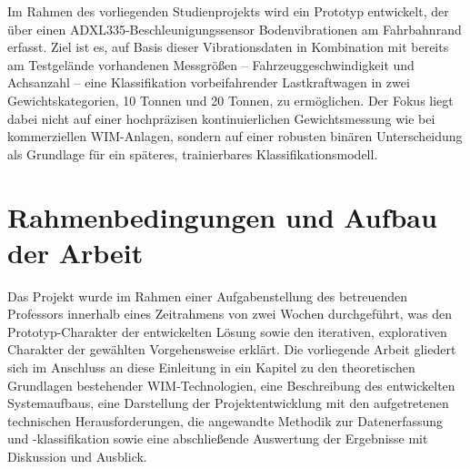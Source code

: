 Im Rahmen des vorliegenden Studienprojekts wird ein Prototyp entwickelt, der über einen ADXL335-Beschleunigungssensor Bodenvibrationen am Fahrbahnrand erfasst. Ziel ist es, auf Basis dieser Vibrationsdaten in Kombination mit bereits am Testgelände vorhandenen Messgrößen -- Fahrzeuggeschwindigkeit und Achsanzahl -- eine Klassifikation vorbeifahrender Lastkraftwagen in zwei Gewichtskategorien, 10 Tonnen und 20 Tonnen, zu ermöglichen. Der Fokus liegt dabei nicht auf einer hochpräzisen kontinuierlichen Gewichtsmessung wie bei kommerziellen WIM-Anlagen, sondern auf einer robusten binären Unterscheidung als Grundlage für ein späteres, trainierbares Klassifikationsmodell.

\section{Rahmenbedingungen und Aufbau der Arbeit}

Das Projekt wurde im Rahmen einer Aufgabenstellung des betreuenden Professors innerhalb eines Zeitrahmens von zwei Wochen durchgeführt, was den Prototyp-Charakter der entwickelten Lösung sowie den iterativen, explorativen Charakter der gewählten Vorgehensweise erklärt. Die vorliegende Arbeit gliedert sich im Anschluss an diese Einleitung in ein Kapitel zu den theoretischen Grundlagen bestehender WIM-Technologien, eine Beschreibung des entwickelten Systemaufbaus, eine Darstellung der Projektentwicklung mit den aufgetretenen technischen Herausforderungen, die angewandte Methodik zur Datenerfassung und -klassifikation sowie eine abschließende Auswertung der Ergebnisse mit Diskussion und Ausblick.